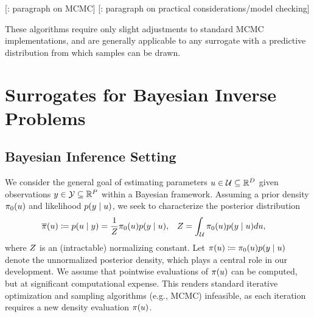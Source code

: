 \documentclass[12pt]{article}
\begin{document}
[\todo: paragraph on MCMC] [\todo: paragraph on practical considerations/model checking]

These algorithms require only
slight adjustments to standard MCMC implementations, and are generally applicable to any 
surrogate with a predictive distribution from which samples can be drawn.

\section{Surrogates for Bayesian Inverse Problems}

\subsection{Bayesian Inference Setting}
We consider the general goal of estimating parameters $u \in \mathcal{U} \subseteq \mathbb{R}^{D}$ given 
observations $y \in \mathcal{Y} \subseteq \mathbb{R}^{P}$ within a Bayesian framework.
Assuming a prior density $\pi_0(u)$ and likelihood $p(y \mid u)$, 
we seek to characterize the posterior distribution 
\begin{align}
&\overline{\pi}(u) \coloneqq p(u \mid y) = \frac{1}{Z} \pi_0(u) p(y \mid u), 
&&Z = \int_{\mathcal{U}} \pi_0(u) p(y \mid u) du, \label{eq:post_dens_generic}
\end{align}
where $Z$ is an (intractable) normalizing constant. 
Let $\pi(u) \coloneqq \pi_0(u) p(y \mid u)$ denote the unnormalized posterior 
density, which plays a central role in our development. 
We assume that pointwise evaluations of  $\pi(u)$ can be computed, but at significant 
computational expense. This renders standard iterative optimization and sampling algorithms 
(e.g., MCMC) infeasible, as each iteration requires a new density evaluation $\pi(u)$.
\end{document}
